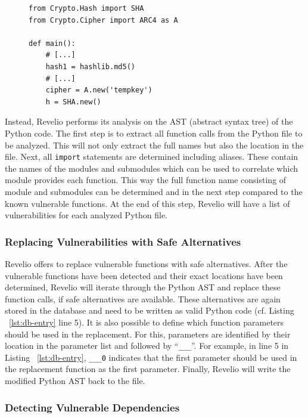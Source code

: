 \begin{figure}[!h]
    \centering
    \begin{lstlisting}[caption={Usage of vulnerable functions in Python},captionpos=b, label={lst:vulnerable-code}]
from Crypto.Hash import SHA
from Crypto.Cipher import ARC4 as A

def main():
    # [...]
    hash1 = hashlib.md5()
    # [...]
    cipher = A.new('tempkey')
    h = SHA.new()
\end{lstlisting}
\end{figure}

Instead, Revelio performs its analysis on the AST (abstract syntax tree) of the Python code. The first step is to extract all function calls from the Python file to be analyzed. This will not only extract the full names but also the location in the file. Next, all \texttt{import} statements are determined including aliases. These contain the names of the modules and submodules which can be used to correlate which module provides each function. This way the full function name consisting of module and submodules can be determined and in the next step compared to the known vulnerable functions. At the end of this step, Revelio will have a list of vulnerabilities for each analyzed Python file. 

\subsubsection{Replacing Vulnerabilities with Safe Alternatives}

Revelio offers to replace vulnerable functions with safe alternatives. After the vulnerable functions have been detected and their exact locations have been determined, Revelio will iterate through the Python AST and replace these function calls, if safe alternatives are available. These alternatives are again stored in the database and need to be written as valid Python code (cf. Listing ~\ref{lst:db-entry} line 5). It is also possible to define which function parameters should be used in the replacement. For this, parameters are identified by their location in the parameter list and followed by \enquote{\texttt{\_\_\_}}. For example, in line 5 in Listing ~\ref{lst:db-entry}, \texttt{\_\_\_0} indicates that the first parameter should be used in the replacement function as the first parameter. Finally, Revelio will write the modified Python AST back to the file.

\subsubsection{Detecting Vulnerable Dependencies}


